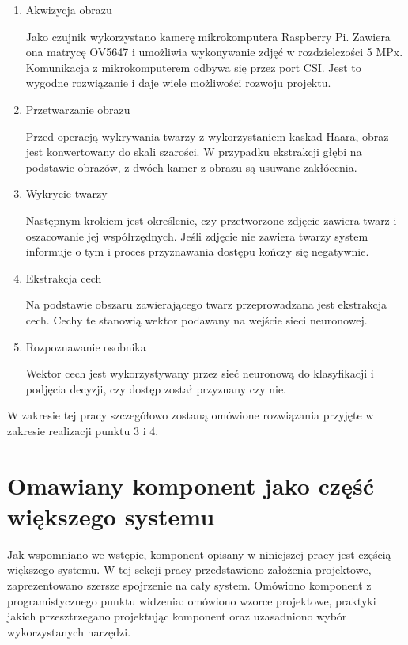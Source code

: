 \documentclass[oneside, eng]{mgr}
\begin{document}
\begin{enumerate}

\item Akwizycja obrazu
	
Jako czujnik wykorzystano kamerę mikrokomputera Raspberry Pi. Zawiera ona matrycę OV5647 i umożliwia wykonywanie zdjęć w rozdzielczości 5 MPx. Komunikacja z mikrokomputerem odbywa się przez port CSI. Jest to wygodne rozwiązanie i daje wiele możliwości rozwoju projektu. 
	
\item Przetwarzanie obrazu

Przed operacją wykrywania twarzy z wykorzystaniem kaskad Haara, obraz jest konwertowany do skali szarości. W przypadku ekstrakcji głębi na podstawie obrazów, z dwóch kamer z obrazu są usuwane zakłócenia.

\item Wykrycie twarzy

Następnym krokiem jest określenie, czy przetworzone zdjęcie zawiera twarz i oszacowanie jej współrzędnych. Jeśli zdjęcie nie zawiera twarzy system informuje o tym i proces przyznawania dostępu kończy się negatywnie.

\item Ekstrakcja cech

Na podstawie obszaru zawierającego twarz przeprowadzana jest ekstrakcja cech. Cechy te stanowią wektor podawany na wejście sieci neuronowej.

\item Rozpoznawanie osobnika

Wektor cech jest wykorzystywany przez sieć neuronową do klasyfikacji i podjęcia decyzji, czy dostęp został przyznany czy nie.

\end{enumerate} 

W zakresie tej pracy szczegółowo zostaną omówione rozwiązania przyjęte w zakresie realizacji punktu 3 i 4. 



\section{Omawiany komponent jako część większego systemu} 

Jak wspomniano we wstępie, komponent opisany w niniejszej pracy jest częścią większego systemu. W tej sekcji pracy przedstawiono założenia projektowe, zaprezentowano szersze spojrzenie na cały system. Omówiono komponent z programistycznego punktu widzenia: omówiono wzorce projektowe, praktyki jakich przesztrzegano projektując komponent oraz uzasadniono wybór wykorzystanych narzędzi.
\end{document}
